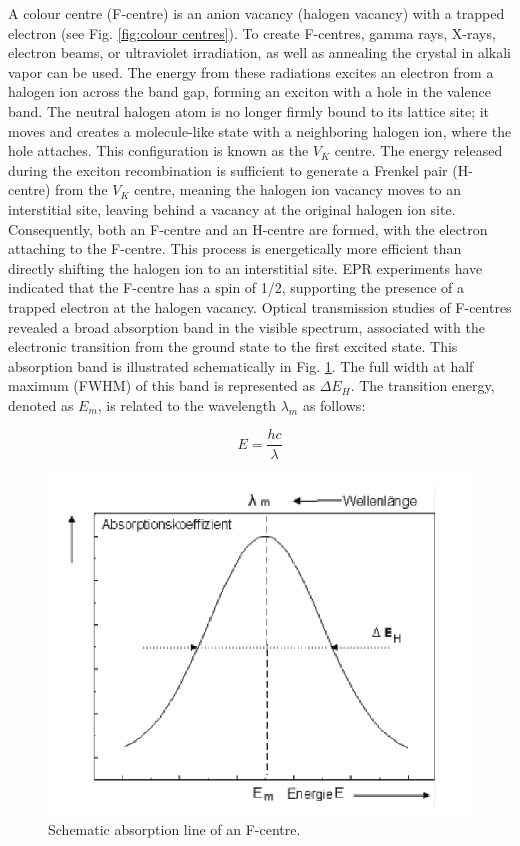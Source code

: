 \documentclass{article}
\begin{document}
A colour centre (F-centre) is an anion vacancy (halogen vacancy) with a trapped electron (see Fig. \ref{fig:colour centres}). To create F-centres, gamma rays, X-rays, electron beams, or ultraviolet irradiation, as well as annealing the crystal in alkali vapor can be used. The energy from these radiations excites an electron from a halogen ion across the band gap, forming an exciton with a hole in the valence band. The neutral halogen atom is no longer firmly bound to its lattice site; it moves and creates a molecule-like state with a neighboring halogen ion, where the hole attaches. This configuration is known as the $V_K$ centre. The energy released during the exciton recombination is sufficient to generate a Frenkel pair (H-centre) from the $V_K$ centre, meaning the halogen ion vacancy moves to an interstitial site, leaving behind a vacancy at the original halogen ion site. Consequently, both an F-centre and an H-centre are formed, with the electron attaching to the F-centre. This process is energetically more efficient than directly shifting the halogen ion to an interstitial site. EPR experiments have indicated that the F-centre has a spin of 1/2, supporting the presence of a trapped electron at the halogen vacancy. Optical transmission studies of F-centres revealed a broad absorption band in the visible spectrum, associated with the electronic transition from the ground state to the first excited state. This absorption band is illustrated schematically in Fig. \ref{fig:peak}. The full width at half maximum (FWHM) of this band is represented as $\Delta E_H$. The transition energy, denoted as $E_m$, is related to the wavelength $\lambda_m$ as follows:

\begin{equation*}
    E = \frac{hc}{\lambda}
\end{equation*}

\begin{figure}[h!]
    \centering
    \includegraphics[width=0.4\linewidth]{Figures/Introduction/2.png}
    \caption{Schematic absorption line of an F-centre.}
    \label{fig:peak}
\end{figure}
\end{document}
